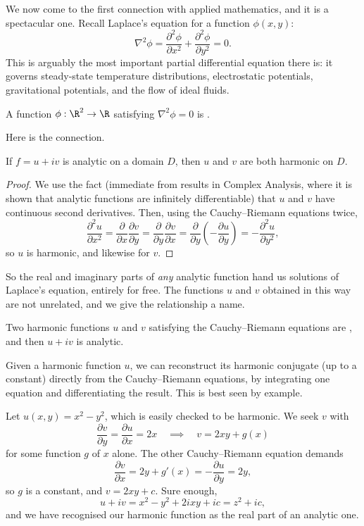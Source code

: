 We now come to the first connection with applied mathematics, and it is a spectacular one. Recall Laplace's equation for a function $\phi(x, y)$:
$$
\nabla^2 \phi = \frac{\partial^2 \phi}{\partial x^2} + \frac{\partial^2 \phi}{\partial y^2} = 0.
$$
This is arguably the most important partial differential equation there is: it governs steady-state temperature distributions, electrostatic potentials, gravitational potentials, and the flow of ideal fluids.

\begin{definition}
	A function $\phi : \R^2 \to \R$ satisfying $\nabla^2 \phi = 0$ is .
\end{definition}

Here is the connection.

\begin{proposition}
	If $f = u + iv$ is analytic on a domain $D$, then $u$ and $v$ are both harmonic on $D$.
\end{proposition}
\begin{proof}
	We use the fact (immediate from results in Complex Analysis, where it is shown that analytic functions are infinitely differentiable) that $u$ and $v$ have continuous second derivatives. Then, using the Cauchy--Riemann equations twice,
	$$
	\frac{\partial^2 u}{\partial x^2} = \frac{\partial}{\partial x}\frac{\partial v}{\partial y} = \frac{\partial}{\partial y} \frac{\partial v}{\partial x} = \frac{\partial}{\partial y}\left(-\frac{\partial u}{\partial y}\right) = -\frac{\partial^2 u}{\partial y^2},
	$$
	so $u$ is harmonic, and likewise for $v$.
\end{proof}

So the real and imaginary parts of \emph{any} analytic function hand us solutions of Laplace's equation, entirely for free. The functions $u$ and $v$ obtained in this way are not unrelated, and we give the relationship a name.

\begin{definition}
	Two harmonic functions $u$ and $v$ satisfying the Cauchy--Riemann equations are , and then $u + iv$ is analytic.
\end{definition}

Given a harmonic function $u$, we can reconstruct its harmonic conjugate (up to a constant) directly from the Cauchy--Riemann equations, by integrating one equation and differentiating the result. This is best seen by example.

\begin{example}
	Let $u(x, y) = x^2 - y^2$, which is easily checked to be harmonic. We seek $v$ with
	$$
	\frac{\partial v}{\partial y} = \frac{\partial u}{\partial x} = 2x
	\quad \implies \quad
	v = 2xy + g(x)
	$$
	for some function $g$ of $x$ alone. The other Cauchy--Riemann equation demands
	$$
	\frac{\partial v}{\partial x} = 2y + g'(x) = -\frac{\partial u}{\partial y} = 2y,
	$$
	so $g$ is a constant, and $v = 2xy + c$. Sure enough,
	$$
	u + iv = x^2 - y^2 + 2ixy + ic = z^2 + ic,
	$$
	and we have recognised our harmonic function as the real part of an analytic one.
\end{example}

